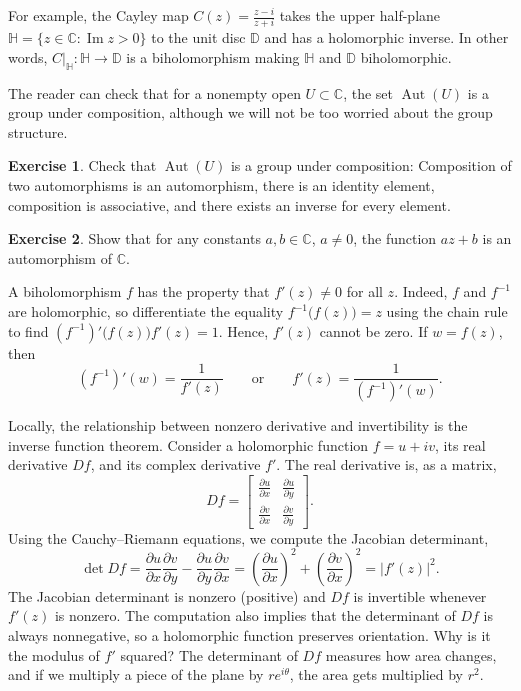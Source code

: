 \documentclass[12pt,openany]{book}
\renewcommand{\Im}{\operatorname{Im}}
\newcommand{\Aut}{\operatorname{Aut}}
\newcommand{\babs}[1]{\bigl\lvert {#1} \bigr\rvert}
\newcommand{\C}{{\mathbb{C}}}
\newcommand{\D}{{\mathbb{D}}}
\newcommand{\bH}{{\mathbb{H}}}
\theoremstyle{plain}
\theoremstyle{remark}
\theoremstyle{definition}
\newenvironment{exbox}{%
    \def\FrameCommand{\vrule width 1pt \relax\hspace{10pt}}%
    \MakeFramed{\advance\hsize-\width\FrameRestore}%
}{%
    \endMakeFramed
}
\theoremstyle{exercise}
\newtheorem{exercise}{Exercise}[section]
\theoremstyle{example}
\begin{document}
For example, the Cayley map
$C(z)
=
\frac{z - i}{z + i}$
takes the upper half-plane
$\bH = \{ z \in \C : \Im z > 0 \}$ to the unit disc $\D$ and
has a holomorphic inverse.
In other words, $C|_{\bH} \colon \bH \to \D$ is a biholomorphism
making $\bH$ and $\D$ biholomorphic.

The reader can check that for a nonempty open $U \subset \C$, the set
$\Aut(U)$ is a group under
composition, although we will not be too worried about the group
structure.

\begin{exbox}
\begin{exercise}
Check that
$\Aut(U)$ is a group under composition:
Composition of two automorphisms is an automorphism,
there is an identity element,
composition is associative,
and there exists an inverse for every element.
\end{exercise}

\begin{exercise}
Show that for any constants $a,b \in \C$, $a \neq 0$, the function
$a z + b$ is an automorphism of $\C$.
\end{exercise}
\end{exbox}

A biholomorphism $f$ has the property that $f'(z) \neq 0$ for all $z$.
Indeed,
$f$ and $f^{-1}$ are holomorphic, so differentiate the
equality
$f^{-1}\bigl(f(z)\bigr) = z$ using the chain rule to find
$(f^{-1})' \bigl(f(z)\bigr) f'(z) = 1$.  Hence, $f'(z)$ cannot be zero.
If $w = f(z)$, then
\begin{equation*}
(f^{-1})'(w) = \frac{1}{f'(z)}
\qquad \text{or} \qquad
f'(z) =
\frac{1}{(f^{-1})'(w)} .
\end{equation*}

Locally, the relationship between nonzero derivative and invertibility is
the inverse function theorem.  Consider a holomorphic function
$f = u+iv$, its real derivative $Df$, and its complex derivative $f'$.
The real derivative is, as a matrix,
\begin{equation*}
Df =
\begin{bmatrix}
\frac{\partial u}{\partial x} & \frac{\partial u}{\partial y} \\[5pt]
\frac{\partial v}{\partial x} & \frac{\partial v}{\partial y}
\end{bmatrix} .
\end{equation*}
Using the Cauchy--Riemann equations, we compute the Jacobian determinant,
\begin{equation*}
\det Df =
\frac{\partial u}{\partial x}
\frac{\partial v}{\partial y} -
\frac{\partial u}{\partial y} 
\frac{\partial v}{\partial x}
=
{\left(\frac{\partial u}{\partial x}\right)}^2
+
{\left(\frac{\partial v}{\partial x}\right)}^2
=
\babs{f'(z)}^2 .
\end{equation*}
The Jacobian determinant is nonzero (positive) and $Df$ is invertible
whenever $f'(z)$ is nonzero.
The computation also implies
that the determinant of
$Df$ is always nonnegative, so a holomorphic function preserves orientation.
Why is it the modulus of $f'$ squared? The determinant of $Df$
measures how area changes, and if we multiply a piece of the plane
by $r e^{i\theta}$, the area gets multiplied by $r^2$.
\end{document}
